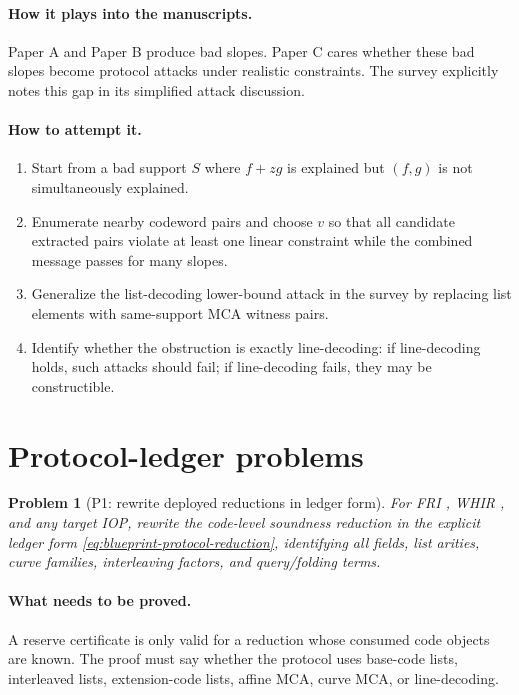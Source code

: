 \documentclass[11pt]{article}
\newtheorem{problem}[theorem]{Problem}
\theoremstyle{definition}
\theoremstyle{remark}
\newcommand{\paperA}{Paper A}
\newcommand{\paperB}{Paper B}
\newcommand{\paperC}{Paper C}
\begin{document}
\paragraph{How it plays into the manuscripts.}  \paperA{} and \paperB{} produce bad slopes.  \paperC{} cares whether these bad slopes become protocol attacks under realistic constraints.  The survey explicitly notes this gap in its simplified attack discussion.

\paragraph{How to attempt it.}
\begin{enumerate}[leftmargin=2.2em]
\item Start from a bad support $S$ where $f+zg$ is explained but $(f,g)$ is not simultaneously explained.
\item Enumerate nearby codeword pairs and choose $v$ so that all candidate extracted pairs violate at least one linear constraint while the combined message passes for many slopes.
\item Generalize the list-decoding lower-bound attack in the survey by replacing list elements with same-support MCA witness pairs.
\item Identify whether the obstruction is exactly line-decoding: if line-decoding holds, such attacks should fail; if line-decoding fails, they may be constructible.
\end{enumerate}

\section{Protocol-ledger problems}
\label{sec:protocol-problems}

\begin{problem}[P1: rewrite deployed reductions in ledger form]
\label{prob:P1}
For FRI \cite{FRI}, WHIR \cite{ACFY25}, and any target IOP, rewrite the code-level soundness reduction in the explicit ledger form \eqref{eq:blueprint-protocol-reduction}, identifying all fields, list arities, curve families, interleaving factors, and query/folding terms.
\end{problem}

\paragraph{What needs to be proved.}  A reserve certificate is only valid for a reduction whose consumed code objects are known.  The proof must say whether the protocol uses base-code lists, interleaved lists, extension-code lists, affine MCA, curve MCA, or line-decoding.
\end{document}
